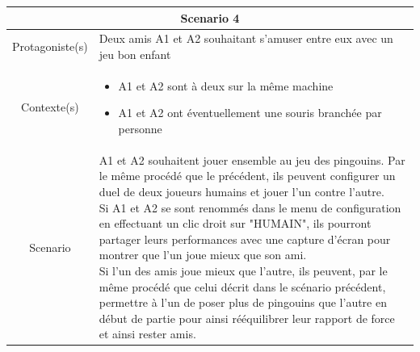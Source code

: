 \documentclass{report}
\begin{document}
\begin{tabular}{|c|l|}
\hline
 \multicolumn{2}{|c|}{Scenario 4}\\
 \hline
 Protagoniste(s) & Deux amis A1 et A2 souhaitant s'amuser entre eux avec un jeu bon enfant \\
 \hline
 Contexte(s) & \parbox{13cm} {\begin{itemize}
 	\item A1 et A2 sont à deux sur la même machine
 	\item A1 et A2 ont éventuellement une souris branchée par personne
\end{itemize} }\\
 \hline
 Scenario & \parbox{13cm}{  A1 et A2 souhaitent jouer ensemble au jeu des pingouins. Par le même procédé que le précédent, ils peuvent configurer un duel de deux joueurs humains et jouer l'un contre l'autre. \\
 Si A1 et A2 se sont renommés dans le menu de configuration en effectuant un clic droit sur "HUMAIN", ils pourront partager leurs performances avec une capture d'écran pour montrer que l'un joue mieux que son ami. \\
 Si l'un des amis joue mieux que l'autre, ils peuvent, par le même procédé que celui décrit dans le scénario précédent, permettre à l'un de poser plus de pingouins que l'autre en début de partie pour ainsi rééquilibrer leur rapport de force et ainsi rester amis.} \\
 \hline
\end{tabular}
\end{document}
